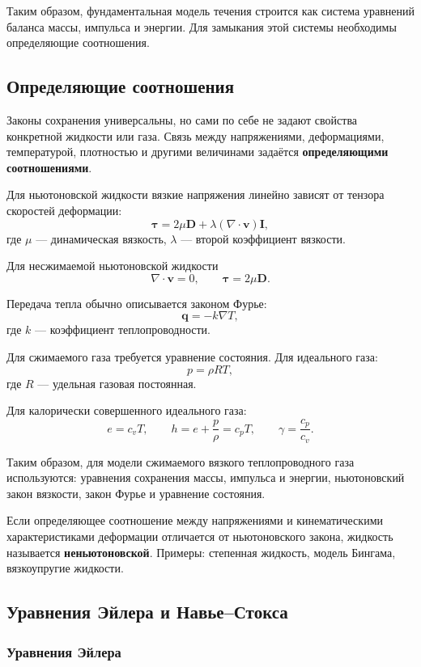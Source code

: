 Таким образом, фундаментальная модель течения строится как система уравнений баланса массы, импульса и энергии. Для замыкания этой системы необходимы определяющие соотношения.

\subsection{Определяющие соотношения}

Законы сохранения универсальны, но сами по себе не задают свойства конкретной жидкости или газа. Связь между напряжениями, деформациями, температурой, плотностью и другими величинами задаётся \textbf{определяющими соотношениями}.

Для ньютоновской жидкости вязкие напряжения линейно зависят от тензора скоростей деформации:
\[
\boldsymbol{\tau}
=
2\mu\mathbf{D}
+
\lambda(\nabla\cdot\mathbf{v})\mathbf{I},
\]
где $\mu$ --- динамическая вязкость, $\lambda$ --- второй коэффициент вязкости.

Для несжимаемой ньютоновской жидкости
\[
\nabla\cdot\mathbf{v}=0,
\qquad
\boldsymbol{\tau}=2\mu\mathbf{D}.
\]

Передача тепла обычно описывается законом Фурье:
\[
\mathbf{q}=-k\nabla T,
\]
где $k$ --- коэффициент теплопроводности.

Для сжимаемого газа требуется уравнение состояния. Для идеального газа:
\[
p=\rho R T,
\]
где $R$ --- удельная газовая постоянная.

Для калорически совершенного идеального газа:
\[
e=c_vT,
\qquad
h=e+\frac{p}{\rho}=c_pT,
\qquad
\gamma=\frac{c_p}{c_v}.
\]

Таким образом, для модели сжимаемого вязкого теплопроводного газа используются: уравнения сохранения массы, импульса и энергии, ньютоновский закон вязкости, закон Фурье и уравнение состояния.

Если определяющее соотношение между напряжениями и кинематическими характеристиками деформации отличается от ньютоновского закона, жидкость называется \textbf{неньютоновской}. Примеры: степенная жидкость, модель Бингама, вязкоупругие жидкости.

\subsection{Уравнения Эйлера и Навье--Стокса}

\subsubsection*{Уравнения Эйлера}

